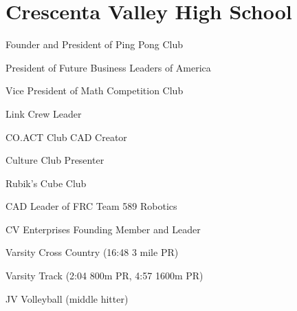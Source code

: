 \documentclass[]{deedy-resume-openfont}
\begin{document}
    
%
%
%
%
\section{Crescenta Valley High School}
\raggedright

\hfill {}
\begin{tightemize}
	\item Founder and President of Ping Pong Club
	\item President of Future Business Leaders of America
	\item Vice President of Math Competition Club
	\item Link Crew Leader
	\item CO.ACT Club CAD Creator
	\item Culture Club Presenter
	\item Rubik's Cube Club
	\item CAD Leader of FRC Team 589 Robotics
	\item CV Enterprises Founding Member and Leader
\end{tightemize}
\sectionsep
{}\hfill \location{ }
\begin{tightemize}
	\item Varsity Cross Country (16:48 3 mile PR)
	\item Varsity Track (2:04 800m PR, 4:57 1600m PR)
	\item JV Volleyball (middle hitter)
\end{tightemize}
\sectionsep

%
%
\end{document}
